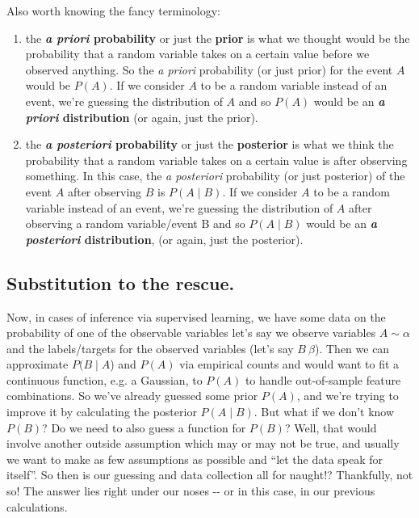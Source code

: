 \documentclass[letterpaper,12pt]{report}
\providecommand{\tightlist}{%
  \setlength{\itemsep}{0pt}\setlength{\parskip}{0pt}}
\begin{document}
Also worth knowing the fancy terminology: 
\begin{enumerate}
  \tightlist
  \item
    the \textbf{\textit{a priori} probability} or just the \textbf{prior} 
    is what 
    we thought would be the
    probability that a random variable takes on a certain value before we
    observed anything. So the \emph{a priori} probability (or just prior)
    for the event \(A\) would be \(P(A)\). If we consider \(A\) to be a
    random variable instead of an event, we're guessing the distribution of
    \(A\) and so \(P(A)\) would be an \textbf{\textit{a priori} distribution}
    (or again, just the prior). 
  \item
    the \textbf{\textit{a posteriori}
    probability} or just the \textbf{posterior}
    is what we think the
    probability that a random variable takes on a certain value is after
    observing something. In this case, the \emph{a posteriori} probability
    (or just posterior) of the event \(A\) after observing \(B\) is
    \(P(A \mid B)\). If we consider \(A\) to be a random variable instead of
    an event, we're guessing the distribution of \(A\) after observing a
    random variable/event B and so \(P(A \mid B)\) would be an
    \textbf{\textit{a posteriori} distribution}, (or again, just the
    posterior).
\end{enumerate}

\subsection{Substitution to the rescue.}\label{subsitution-to-the-rescue}
Now, in cases of inference via supervised learning, 
we have some data on the probability of one of the observable variables
\textemdash{} let's say we observe variables \(A \sim \alpha\) \textemdash{}
and the labels/targets for the observed variables (let's say \(B ~ \beta\)).
Then we can approximate \(P(B \mid A\)) and \(P(A)\) via empirical counts \textemdash{}
and would want to fit a continuous function, e.g. a Gaussian, to \(P(A)\) to
handle out-of-sample feature combinations.
So we've already guessed some prior \(P(A)\), and we're trying to improve it by
calculating the posterior \( P(A \mid B) \). But what if we don't know
\( P(B) \)? Do we need to also guess a function for \( P(B) \)? Well, that would
involve another outside assumption which may or may not be true, and usually we want
to make as few assumptions as possible and
``let the data speak for itself''.
So then is our guessing and data collection all for naught!?
Thankfully, not so! The answer lies right under our noses -\/- or in
this case, in our previous calculations.
\end{document}
